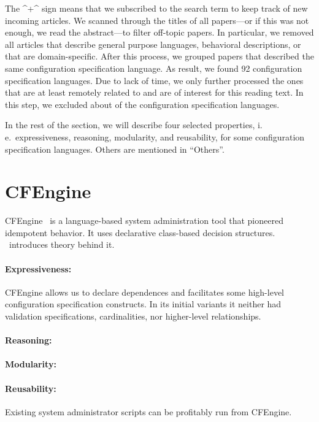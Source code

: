 The ^+^ sign means that we subscribed to the search term to keep track of new incoming articles.
We scanned through the titles of all papers---or if this was not enough, we read the abstract---to filter off-topic papers.
In particular, we removed all articles that describe general purpose languages, behavioral descriptions, or that are domain-specific.
After this process, we grouped papers that described the same configuration specification language.
As result, we found 92 configuration specification languages.
Due to lack of time, we only further processed the ones that are at least remotely related to  and are of interest for this reading text.
In this step, we excluded about  of the configuration specification languages.

In the rest of the section, we will describe four selected properties, i.\,e.\ expressiveness, reasoning, modularity, and reusability, for some configuration specification languages.
Others are mentioned in ``Others''.



\section{CFEngine}

CFEngine~\cite{burgess1995cfengine,pandey2012investigating} is a language-based system administration tool that pioneered idempotent behavior.
It uses declarative class-based decision structures.
\citet{burgess2003theory}~introduces theory behind it.

\paragraph*{Expressiveness:}
CFEngine allows us to declare dependences and facilitates some high-level configuration specification constructs.
In its initial variants it neither had validation specifications, cardinalities, nor higher-level relationships.
\paragraph*{Reasoning:}
\notsupported{}
\paragraph*{Modularity:}
\notsupported{}

\paragraph*{Reusability:}
Existing system administrator scripts can be profitably run from CFEngine.



